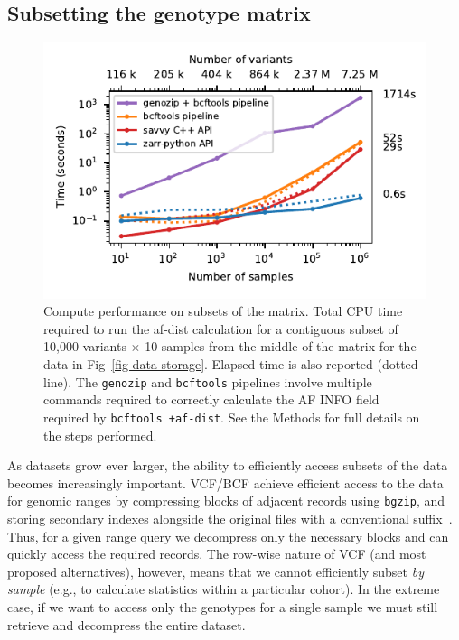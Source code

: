 \documentclass[a4paper,num-refs]{oup-contemporary}
\begin{document}
\subsection{Subsetting the genotype matrix}
\begin{figure}[t]
\includegraphics{figures/subset-matrix-compute}
\caption{Compute performance on subsets of the matrix.
Total CPU time required to run the af-dist calculation for
a contiguous subset of 10,000 variants $\times$ 10 samples 
from the middle of the matrix
for the data in Fig~\ref{fig-data-storage}.
Elapsed time is also reported (dotted line). 
The \texttt{genozip} and \texttt{bcftools} pipelines involve
multiple commands required to correctly calculate the AF INFO field
required by \texttt{bcftools +af-dist}. See the Methods for full details
on the steps performed.
\label{fig-subset-matrix-compute}}
\end{figure}

As datasets grow ever larger, the ability to efficiently access subsets 
of the data becomes increasingly important. VCF/BCF achieve efficient 
access to the data for genomic ranges 
by compressing blocks of adjacent records using \texttt{bgzip},
and storing secondary indexes alongside the original 
files with a conventional suffix~\citep{li2011tabix}. 
Thus, for a given range query we 
decompress only the necessary blocks and can quickly access
the required records. 
The row-wise nature of VCF (and most proposed alternatives), however, means
that we cannot efficiently subset \emph{by sample}
(e.g., to calculate statistics within a particular cohort). In the extreme
case, if we want to access only the genotypes for a single sample
we must still retrieve and decompress the entire dataset.
\end{document}
